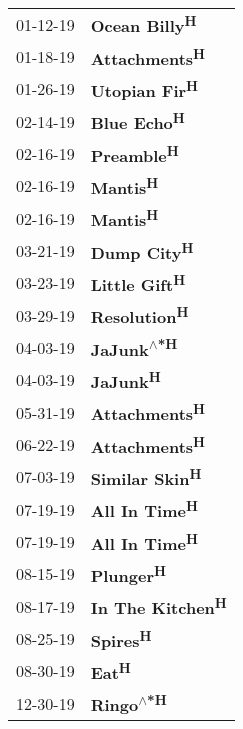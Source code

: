 \begin{supertabular}{p{0.25\columnwidth}p{0.75\columnwidth}}
 01-12-19 &      \textbf{Ocean Billy\textsuperscript{H}} \\
 01-18-19 &      \textbf{Attachments\textsuperscript{H}} \\
 01-26-19 &      \textbf{Utopian Fir\textsuperscript{H}} \\
 02-14-19 &        \textbf{Blue Echo\textsuperscript{H}} \\
 02-16-19 &         \textbf{Preamble\textsuperscript{H}} \\
 02-16-19 &           \textbf{Mantis\textsuperscript{H}} \\
 02-16-19 &           \textbf{Mantis\textsuperscript{H}} \\
 03-21-19 &        \textbf{Dump City\textsuperscript{H}} \\
 03-23-19 &      \textbf{Little Gift\textsuperscript{H}} \\
 03-29-19 &       \textbf{Resolution\textsuperscript{H}} \\
 04-03-19 &  \textbf{JaJunk\textsuperscript{$\wedge$*H}} \\
 04-03-19 &           \textbf{JaJunk\textsuperscript{H}} \\
 05-31-19 &      \textbf{Attachments\textsuperscript{H}} \\
 06-22-19 &      \textbf{Attachments\textsuperscript{H}} \\
 07-03-19 &     \textbf{Similar Skin\textsuperscript{H}} \\
 07-19-19 &      \textbf{All In Time\textsuperscript{H}} \\
 07-19-19 &      \textbf{All In Time\textsuperscript{H}} \\
 08-15-19 &          \textbf{Plunger\textsuperscript{H}} \\
 08-17-19 &   \textbf{In The Kitchen\textsuperscript{H}} \\
 08-25-19 &           \textbf{Spires\textsuperscript{H}} \\
 08-30-19 &              \textbf{Eat\textsuperscript{H}} \\
 12-30-19 &   \textbf{Ringo\textsuperscript{$\wedge$*H}} \\
\end{supertabular}
